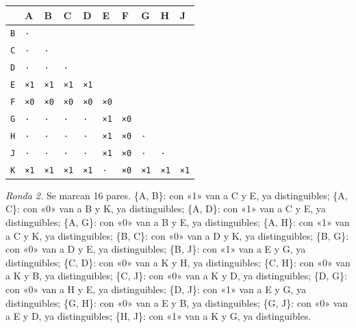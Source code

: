 \documentclass[11pt]{article}
\begin{document}
\begin{center}\footnotesize\begin{tabular}{llllllllll}\toprule
 & A & B & C & D & E & F & G & H & J \\\midrule
\texttt{B} & \texttt{·} & \texttt{} & \texttt{} & \texttt{} & \texttt{} & \texttt{} & \texttt{} & \texttt{} & \texttt{} \\
\texttt{C} & \texttt{·} & \texttt{·} & \texttt{} & \texttt{} & \texttt{} & \texttt{} & \texttt{} & \texttt{} & \texttt{} \\
\texttt{D} & \texttt{·} & \texttt{·} & \texttt{·} & \texttt{} & \texttt{} & \texttt{} & \texttt{} & \texttt{} & \texttt{} \\
\texttt{E} & \texttt{×1} & \texttt{×1} & \texttt{×1} & \texttt{×1} & \texttt{} & \texttt{} & \texttt{} & \texttt{} & \texttt{} \\
\texttt{F} & \texttt{×0} & \texttt{×0} & \texttt{×0} & \texttt{×0} & \texttt{×0} & \texttt{} & \texttt{} & \texttt{} & \texttt{} \\
\texttt{G} & \texttt{·} & \texttt{·} & \texttt{·} & \texttt{·} & \texttt{×1} & \texttt{×0} & \texttt{} & \texttt{} & \texttt{} \\
\texttt{H} & \texttt{·} & \texttt{·} & \texttt{·} & \texttt{·} & \texttt{×1} & \texttt{×0} & \texttt{·} & \texttt{} & \texttt{} \\
\texttt{J} & \texttt{·} & \texttt{·} & \texttt{·} & \texttt{·} & \texttt{×1} & \texttt{×0} & \texttt{·} & \texttt{·} & \texttt{} \\
\texttt{K} & \texttt{×1} & \texttt{×1} & \texttt{×1} & \texttt{×1} & \texttt{·} & \texttt{×0} & \texttt{×1} & \texttt{×1} & \texttt{×1} \\
\bottomrule\end{tabular}\end{center}
\textit{Ronda 2.} Se marcan 16 pares. \{A, B\}: con «1» van a C y E, ya distinguibles; \{A, C\}: con «0» van a B y K, ya distinguibles; \{A, D\}: con «1» van a C y E, ya distinguibles; \{A, G\}: con «0» van a B y E, ya distinguibles; \{A, H\}: con «1» van a C y K, ya distinguibles; \{B, C\}: con «0» van a D y K, ya distinguibles; \{B, G\}: con «0» van a D y E, ya distinguibles; \{B, J\}: con «1» van a E y G, ya distinguibles; \{C, D\}: con «0» van a K y H, ya distinguibles; \{C, H\}: con «0» van a K y B, ya distinguibles; \{C, J\}: con «0» van a K y D, ya distinguibles; \{D, G\}: con «0» van a H y E, ya distinguibles; \{D, J\}: con «1» van a E y G, ya distinguibles; \{G, H\}: con «0» van a E y B, ya distinguibles; \{G, J\}: con «0» van a E y D, ya distinguibles; \{H, J\}: con «1» van a K y G, ya distinguibles.
\end{document}
